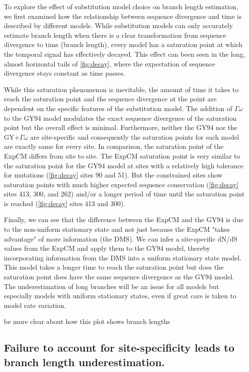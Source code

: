 \documentclass[11pt]{article}
\newcommand\skhcomment[1]{{\color{magenta}#1}}
\begin{document}
To explore the effect of substitution model choice on branch length estimation, we first examined how the relationship between sequence divergence and time is described by different models. 
While substitution models can only accurately estimate branch length when there is a clear transformation from sequence divergence to time (branch length), every model has a saturation point at which the temporal signal has effectively decayed. 
This effect can been seen in the long, almost horizontal tails of \ref{fig:decay}, where the expectation of sequence divergence stays constant as time passes. 

While this saturation phenomenon is inevitable, the amount of time it takes to reach the saturation point and the sequence divergence at the point are dependent on the specific features of the substitution model. 
The addition of $\Gamma\omega$ to the GY94 model modulates the exact sequence divergence of the saturation point but the overall effect is minimal. 
Furthermore, neither the GY94 nor the GY+$\Gamma\omega$ are site-specific and consequently the saturation points for each model are exactly same for every site. 
In comparison, the saturation point of the ExpCM differs from site to site. 
The ExpCM saturation point is very similar to the saturation point for the GY94 model at sites with a relatively high tolerance for mutations (\ref{fig:decay} sites 90 and 51). 
But the constrained sites show saturation points with much higher expected sequence conservation (\ref{fig:decay} sites 413, 300, and 262) and/or a longer period of time until the saturation point is reached (\ref{fig:decay} sites 413 and 300). 

Finally, we can see that the difference between the ExpCM and the GY94 is due to the non-uniform stationary state and not just because the ExpCM "takes advantage" of more information (the DMS). 
We can infer a site-specific dN/dS values from the ExpCM \cite{spielman2015relationship} and apply them to the GY94 model, thereby incorporating information from the DMS into a uniform stationary state model. 
This model takes a longer time to reach the saturation point but does the saturation point does have the same sequence divergence as the GY94 model. 
The underestimation of long branches will be an issue for all models but especially models with uniform stationary states, even if great care is taken to model rate variation. 

\skhcomment{be more clear about how this plot shows branch lengths }


\subsection*{Failure to account for site-specificity leads to branch length underestimation.}
\end{document}
